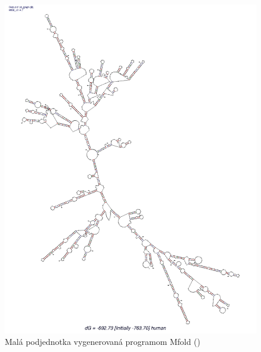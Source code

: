 \begin{figure}
  \includegraphics[trim=0 0 2cm 0, width=1\textwidth]{../img/human_mfold}
  \caption{Malá podjednotka vygenerovaná programom Mfold (\citet{MFOLD})}
  \label{obr:RNA_human_mfold}
\end{figure}

